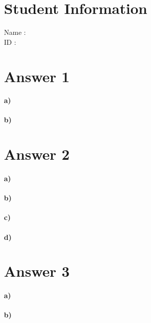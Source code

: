 \documentclass[12pt]{article}
\begin{document}
\section*{Student Information}

Name : \\

ID : \\


\section*{Answer 1}
\paragraph{a)}
\paragraph{b)}

\section*{Answer 2}
\paragraph{a)}
\paragraph{b)}
\paragraph{c)}
\paragraph{d)}

\section*{Answer 3}
\paragraph{a)}
\paragraph{b)}
\end{document}
